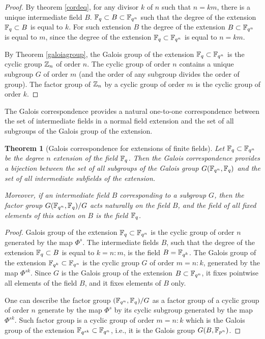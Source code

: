\documentclass[11pt]{article}
\theoremstyle{plain}
\newtheorem{theorem}{Theorem}[section]
\theoremstyle{definition}
\begin{document}
\begin{proof}  By theorem \ref{cordeq}, for any divisor $k$ of $n$ such that $n=k m$, there is a unique intermediate field $B$. $\Bbb F_q\subset B\subset \Bbb F_{q^n}$ such that the degree of the extension $\Bbb F_q\subset B$ is equal to $k$. For such extension $B$ the degree of the extension $B\subset \Bbb F_{q^n}$ is equal to $m$, since the degree of the extension $\Bbb F_q\subset \Bbb F_{q^n}$ is equal to $n=km$.

By Theorem \ref{galoiagroup},  the Galois group of the extension $\Bbb F_q \subset \Bbb F_{q^n}$ is the cyclic group $\Bbb Z_n$  of order $n$. The cyclic group of order $n$ contains a unique subgroup $G$ of order $m$ (and the order of any subgroup divides the order of group). The factor group of $\Bbb Z_n$ by a cyclic group of order $m$ is the cyclic group of order $k$.
  \end{proof}

The Galois correspondence provides a natural one-to-one
correspondence   between the set of intermediate fields in a normal field extension and the set of all subgroups of the Galois group of
 the extension.
\begin{theorem}[Galois correspondence for extensions of finite fields] \label{Galcor} Let $\Bbb F_q\subset \Bbb F_{q^n}$ be the degree $n$ extension of the  field $\Bbb F_q$. Then the Galois correspondence provides a bijection between the set of all subgroups of the Galois group $G(\Bbb F_{q^n},  \Bbb F_q)$ and the set of all intermediate subfields of the extension.

Moreover, if an intermediate field $B$  corresponding to a subgroup $G$, then the factor group $G(\Bbb F_{q^n},\Bbb F_q)/G$ acts naturally on the field $B$, and the field of all fixed  elements  of this action on $B$ is the field $\Bbb F_q$.
\end{theorem}

\begin{proof}Galois group of the extension $\Bbb F_q \subset \Bbb F_{q^n}$ is the cyclic group of order $n$ generated by the map $\Phi^s$. The intermediate fields $B$, such that the degree of the extension $\Bbb F_q\subset B$ is equal to $k=n:m$, is the field  $B=\Bbb  F_{q^k}$.  The Galois group of the extension $\Bbb  F_{q^k}\subset \Bbb F_{q^n}$ is the cyclic group $G$ of order $m=n:k$, generated by the map $\Phi^{sk}$. Since $G$ is the Galois group of the extension $B\subset \Bbb F_{q^n}$, it fixes pointwise all elements of the field $B$, and it fixes elements of $B$ only.

One can describe the factor group $(\Bbb F_{q^n},\Bbb F_q)/G$  as a factor group of a cyclic group of order $n$  generate by the map $\Phi^s$ by its cyclic subgroup generated by the map $\Phi ^{sk}$. Such factor group is a cyclic group of order $m=n:k$
which is the Galois group of the extension $\Bbb F_{q^{sk}}\subset \Bbb F_{q^n}$, i.e., it is the Galois group
$G(B,\Bbb F_{p^n})$.
\end{proof}
\end{document}
